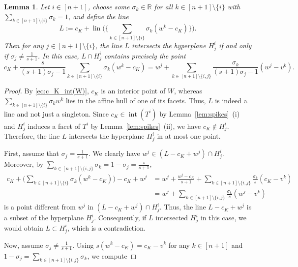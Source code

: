 \documentclass{amsart}
\newtheorem{lemma}[theorem]{Lemma}
\newcommand\R{\mathbb{R}}
\DeclareMathOperator{\lin}{lin}
\DeclareMathOperator{\inte}{int}
\begin{document}
\begin{lemma}\label{lem:lines_meeting_spikes}
Let $i \in [n+1]$, choose some $\sigma_k \in \R$ for all $k \in [n+1] \setminus \{i\}$ with $\sum_{k \in [n+1] \setminus \{i\}} \sigma_k = 1$,
and define the line
\[
	L
	:= c_K + \lin \Bigg( \Bigg\{ \sum_{k \in [n+1] \setminus \{i\}} \sigma_k (w^k - c_K) \Bigg\} \Bigg).
\]
Then for any $j \in [n+1] \setminus \{i\}$, the line $L$
intersects the hyperplane $H^{i}_j$ if and only if $\sigma_j \neq \frac{1}{s+1}$.
In this case, $L \cap H^i_j$ contains precisely the point
\[
	c_K + \frac{s}{(s+1) \sigma_j - 1} \sum_{k \in [n+1] \setminus \{i\}} \sigma_k (w^k - c_K)
		= w^j + \sum_{k \in [n+1] \setminus \{i,j\}} \frac{\sigma_k}{(s+1) \sigma_j - 1} (w^j - v^k).
\]
\end{lemma}
\begin{proof}
By \eqref{eq:c_K_int(W)}, $c_K$ is an interior point of $W$,
whereas $\sum_{k \in [n+1] \setminus \{i\}} \sigma_k w^k$ lies in the affine hull of one of its facets.
Thus, $L$ is indeed a line and not just a singleton.
Since $c_K \in \inte(T^i)$ by Lemma~\ref{lem:spikes}~(i) and $H^i_j$ induces a facet of $T^i$ by Lemma~\ref{lem:spikes}~(ii),
we have $c_K \notin H^i_j$.
Therefore, the line $L$ intersects the hyperplane $H^i_j$ in at most one point.

First, assume that $\sigma_j = \frac{1}{s+1}$.
We clearly have $w^j \in (L - c_K + w^j) \cap H^i_j$.
Moreover, by $\sum_{k \in [n+1] \setminus \{i,j\}} \sigma_k = 1 - \sigma_j = \frac{s}{s+1}$,
\begin{align*}
    c_K + \Bigg(\sum_{k \in [n+1] \setminus \{i\}} \sigma_k (w^k - c_K) \Bigg) - c_K + w^j
    & = w^j + \frac{w^j - c_K}{s+1} + \sum_{k \in [n+1] \setminus \{i,j\}} \frac{\sigma_k}{s} (c_K - v^k)
    \\
    & = w^j + \sum_{k \in [n+1] \setminus \{i,j\}} \frac{\sigma_k}{s} (w^j - v^k)
\end{align*}
is a point different from $w^j$ in $(L - c_K + w^j) \cap H^i_j$.
Thus, the line $L - c_K + w^j$ is a subset of the hyperplane $H^i_j$.
Consequently, if $L$ intersected $H^i_j$ in this case, we would obtain $L \subset H^i_j$, which is a contradiction.

Now, assume $\sigma_j \neq \frac{1}{s+1}$.
Using $s (w^k - c_K) = c_K - v^k$ for any $k \in [n+1]$ and $1 - \sigma_j = \sum_{k \in [n+1] \setminus \{i,j\}} \sigma_k$,
we compute


\end{proof}
\end{document}
